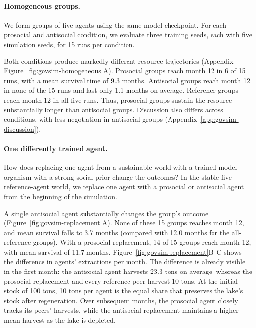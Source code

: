 \documentclass{article} %
\begin{document}
\paragraph{Homogeneous groups.}
We form groups of five agents using the same model checkpoint. For each prosocial and antisocial condition, we evaluate three training seeds, each with five simulation seeds, for 15 runs per condition.

Both conditions produce markedly different resource trajectories (Appendix Figure~\ref{fig:govsim-homogeneous}A). Prosocial groups reach month 12 in 6 of 15 runs, with a mean survival time of 9.3 months. Antisocial groups reach month 12 in none of the 15 runs and last only 1.1 months on average. Reference groups reach month 12 in all five runs. Thus, prosocial groups sustain the resource substantially longer than antisocial groups. Discussion also differs across conditions, with less negotiation in antisocial groups (Appendix~\ref{app:govsim-discussion}).

\paragraph{One differently trained agent.}
How does replacing one agent from a sustainable world with a trained model organism with a strong social prior change the outcomes? In the stable five-reference-agent world, we replace one agent with a prosocial or antisocial agent from the beginning of the simulation.

A single antisocial agent substantially changes the group's outcome (Figure~\ref{fig:govsim-replacement}A). None of these 15 groups reaches month 12, and mean survival falls to 3.7 months (compared with 12.0 months for the all-reference groups). With a prosocial replacement, 14 of 15 groups reach month 12, with mean survival of 11.7 months. Figure~\ref{fig:govsim-replacement}B--C shows the difference in agents' extractions per month. The difference is already visible in the first month: the antisocial agent harvests 23.3 tons on average, whereas the prosocial replacement and every reference peer harvest 10 tons. At the initial stock of 100 tons, 10 tons per agent is the equal share that preserves the lake's stock after regeneration. Over subsequent months, the prosocial agent closely tracks its peers' harvests, while the antisocial replacement maintains a higher mean harvest as the lake is depleted.
\end{document}
